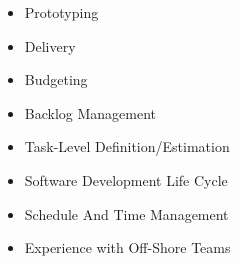 
  \begin{itemize}
    \setlength\itemsep{-0.3em}
    \item Prototyping
    \item Delivery
    \item Budgeting
    \item Backlog Management 
    \item Task-Level Definition/Estimation
    \item Software Development Life Cycle %
    \item Schedule And Time Management
    \item Experience with Off-Shore Teams %
  \end{itemize}
